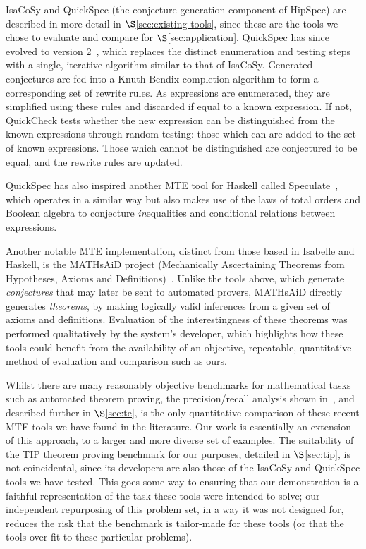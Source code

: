 IsaCoSy and QuickSpec (the conjecture generation component of HipSpec) are
described in more detail in $\S$\ref{sec:existing-tools}, since these are the
tools we chose to evaluate and compare for $\S$\ref{sec:application}. QuickSpec
has since evolved to version 2~\cite{smallbone2017quick}, which replaces the
distinct enumeration and testing steps with a single, iterative algorithm
similar to that of IsaCoSy. Generated conjectures are fed into a Knuth-Bendix
completion algorithm to form a corresponding set of rewrite rules. As
expressions are enumerated, they are simplified using these rules and discarded
if equal to a known expression. If not, QuickCheck tests whether the new
expression can be distinguished from the known expressions through random
testing: those which can are added to the set of known expressions. Those which
cannot be distinguished are conjectured to be equal, and the rewrite rules are
updated.

QuickSpec has also inspired another MTE tool for Haskell called
Speculate~\cite{braquehais2017speculate}, which operates in a similar way but
also makes use of the laws of total orders and Boolean algebra to conjecture
\emph{in}equalities and conditional relations between expressions.

Another notable MTE implementation, distinct from those based in Isabelle and
Haskell, is the MATHsAiD project (Mechanically Ascertaining Theorems from
Hypotheses, Axioms and Definitions)~\cite{roy}. Unlike the tools above, which
generate \emph{conjectures} that may later be sent to automated provers,
MATHsAiD directly generates \emph{theorems}, by making logically valid
inferences from a given set of axioms and definitions. Evaluation of the
interestingness of these theorems was performed qualitatively by the system's
developer, which highlights how these tools could benefit from the availability
of an objective, repeatable, quantitative method of evaluation and comparison
such as ours.

Whilst there are many reasonably objective benchmarks for mathematical tasks
such as automated theorem proving, the precision/recall analysis shown
in~\cite{claessen2013automating}, and described further in $\S$\ref{sec:te}, is
the only quantitative comparison of these recent MTE tools we have found in the
literature. Our work is essentially an extension of this approach, to a larger
and more diverse set of examples. The suitability of the TIP theorem proving
benchmark for our purposes, detailed in $\S$\ref{sec:tip}, is not coincidental,
since its developers are also those of the IsaCoSy and QuickSpec tools we have
tested. This goes some way to ensuring that our demonstration is a faithful
representation of the task these tools were intended to solve; our independent
repurposing of this problem set, in a way it was not designed for, reduces the
risk that the benchmark is tailor-made for these tools (or that the tools
over-fit to these particular problems).

